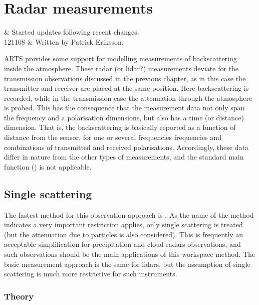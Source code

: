 \chapter{Radar measurements}
 \label{sec:cradar}


 & Started updates following recent changes.\\
 121108 & Written by Patrick Eriksson.\\
\stophistory

ARTS provides some support for modelling measurements of backscattering inside
the atmosphere. 
These radar (or lidar?) measurements deviate for the transmission observations
discussed in the previous chapter, as in this case the transmitter and receiver
are placed at the same position. Here backscattering is recorded, while in the
transmission case the attenuation through the atmosphere is probed. This has
the consequence that the measurement data not only span the frequency and a
polarisation dimensions, but also has a time (or distance) dimension. That is,
the backscattering is basically reported as a function of distance from the
sensor, for one or several frequencies frequencies and combinations of
transmitted and received polarisations. Accordingly, these data differ in
nature from the other types of measurements, and the standard main function
() is not applicable.



\section{Single scattering}
\label{sec:cradar:single}

The fastest method for this observation approach is
. As the name of the method indicates a very
important restriction applies, only single scattering is treated (but the
attenuation due to particles is also considered). This is frequently an
acceptable simplification for precipitation and cloud radars observations, and
such observations should be the main applications of this workspace method.
The basic measurement approach is the same for lidars, but the assumption of
single scattering is much more restrictive for such instruments.

\subsection{Theory}
\label{sec:cradar:theory}


